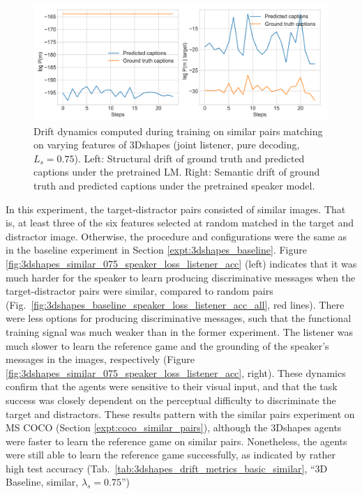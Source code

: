 \begin{figure}[h]
	\centering
	\includegraphics[width=\linewidth]{images/3dshapes_structural_semantic_drift_4000_pure_075_similar.png}
	\caption{Drift dynamics computed during training on similar pairs matching on varying features of 3Dshapes (joint listener, pure decoding, $L_s = 0.75$). Left: Structural drift of ground truth and predicted captions under the pretrained LM. Right: Semantic drift of ground truth and predicted captions under the pretrained speaker model.} 
	\label{fig:3dshapes_similar_075_str_sem_drift}
\end{figure}

In this experiment, the target-distractor pairs consisted of similar images. That is, at least three of the six features selected at random matched in the target and distractor image. Otherwise, the procedure and configurations were the same as in the baseline experiment in Section \ref{expt:3dshapes_baseline}. 
Figure \ref{fig:3dshapes_similar_075_speaker_loss_listener_acc} (left) indicates that it was much harder for the speaker to learn producing discriminative messages when the target-distractor pairs were similar, compared to random pairs (Fig.~\ref{fig:3dshapes_baseline_speaker_loss_listener_acc_all}, red lines). There were less options for producing discriminative messages, such that the functional training signal was much weaker than in the former experiment. The listener was much slower to learn the reference game and the grounding of the speaker's messages in the images, respectively (Figure \ref{fig:3dshapes_similar_075_speaker_loss_listener_acc}, right). These dynamics confirm that the agents were sensitive to their visual input, and that the task success was closely dependent on the perceptual difficulty to discriminate the target and distractors. These results pattern with the similar pairs experiment on MS COCO (Section \ref{expt:coco_similar_pairs}), although the 3Dshapes agents were faster to learn the reference game on similar pairs. Nonetheless, the agents were still able to learn the reference game successfully, as indicated by rather high test accuracy (Tab.~\ref{tab:3dshapes_drift_metrics_basic_similar}, ``3D Baseline, similar, $\lambda_s = 0.75$'')

